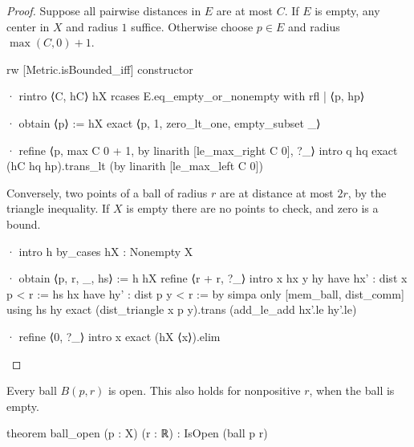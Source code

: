 \begin{proof}
  Suppose all pairwise distances in $E$ are at most $C$.
  If $E$ is empty, any center in $X$ and radius $1$ suffice.
  Otherwise choose $p\in E$ and radius $\max(C,0)+1$.

  \begin{lean}
    rw [Metric.isBounded_iff]
    constructor

    · rintro ⟨C, hC⟩ hX
      rcases E.eq_empty_or_nonempty with rfl | ⟨p, hp⟩

      · obtain ⟨p⟩ := hX
        exact ⟨p, 1, zero_lt_one, empty_subset _⟩

      · refine ⟨p, max C 0 + 1, by linarith [le_max_right C 0], ?_⟩
        intro q hq
        exact (hC hq hp).trans_lt (by linarith [le_max_left C 0])
  \end{lean}

  Conversely, two points of a ball of radius $r$ are at distance at most $2r$, by the triangle
  inequality.
  If $X$ is empty there are no points to check, and zero is a bound.

  \begin{lean}
    · intro h
      by_cases hX : Nonempty X

      · obtain ⟨p, r, _, hs⟩ := h hX
        refine ⟨r + r, ?_⟩
        intro x hx y hy
        have hx' : dist x p < r := hs hx
        have hy' : dist p y < r := by
          simpa only [mem_ball, dist_comm] using hs hy
        exact (dist_triangle x p y).trans (add_le_add hx'.le hy'.le)

      · refine ⟨0, ?_⟩
        intro x
        exact (hX ⟨x⟩).elim
  \end{lean}
\end{proof}

\begin{proposition}
  \label{ma:thm:neighborhood-is-open}
  Every ball $B(p,r)$ is open.
  This also holds for nonpositive $r$, when the ball is empty.

  \begin{lean}
    theorem ball_open (p : X) (r : ℝ) : IsOpen (ball p r)
  \end{lean}
\end{proposition}

